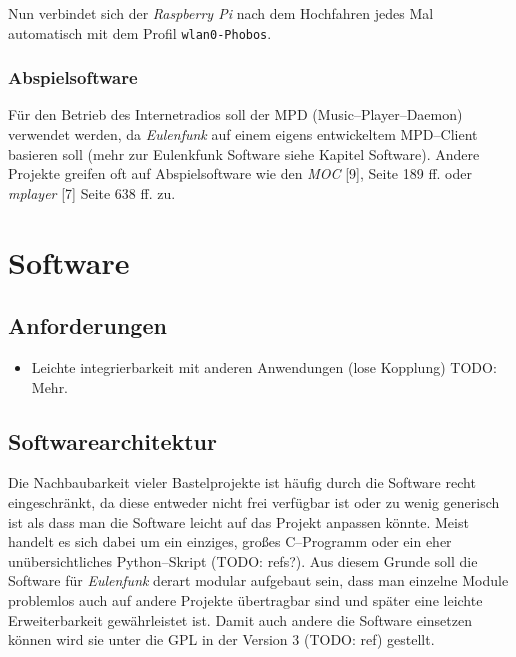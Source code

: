 \documentclass[11pt,ngerman,toc=listof,index=totoc]{scrreprt}
\newenvironment{Shaded}{}{}
\newcommand{\KeywordTok}[1]{\textcolor[rgb]{0.00,0.44,0.13}{\textbf{{#1}}}}
\newcommand{\CommentTok}[1]{\textcolor[rgb]{0.38,0.63,0.69}{\textit{{#1}}}}
\newcommand{\NormalTok}[1]{{#1}}
\providecommand{\tightlist}{%
  \setlength{\itemsep}{0pt}\setlength{\parskip}{0pt}}
\begin{document}
Nun verbindet sich der \emph{Raspberry Pi} nach dem Hochfahren jedes Mal
automatisch mit dem Profil \texttt{wlan0-Phobos}.

\subsection{Abspielsoftware}\label{abspielsoftware}

Für den Betrieb des Internetradios soll der MPD (Music--Player--Daemon)
verwendet werden, da \emph{Eulenfunk} auf einem eigens entwickeltem
MPD--Client basieren soll (mehr zur Eulenkfunk Software siehe Kapitel
Software). Andere Projekte greifen oft auf Abspielsoftware wie den
\emph{MOC} {[}9{]}, Seite 189 ff. oder \emph{mplayer} {[}7{]} Seite 638
ff. zu.

\begin{Shaded}
\end{Shaded}

\chapter{Software}\label{software}

\section{Anforderungen}\label{anforderungen}

\begin{itemize}
\tightlist
\item
  Leichte integrierbarkeit mit anderen Anwendungen (lose Kopplung) TODO:
  Mehr.
\end{itemize}

\section{Softwarearchitektur}\label{softwarearchitektur}

Die Nachbaubarkeit vieler Bastelprojekte ist häufig durch die Software
recht eingeschränkt, da diese entweder nicht frei verfügbar ist oder zu
wenig generisch ist als dass man die Software leicht auf das Projekt
anpassen könnte. Meist handelt es sich dabei um ein einziges, großes
C--Programm oder ein eher unübersichtliches Python--Skript (TODO:
refs?). Aus diesem Grunde soll die Software für \emph{Eulenfunk} derart
modular aufgebaut sein, dass man einzelne Module problemlos auch auf
andere Projekte übertragbar sind und später eine leichte Erweiterbarkeit
gewährleistet ist. Damit auch andere die Software einsetzen können wird
sie unter die GPL in der Version 3 (TODO: ref) gestellt.
\end{document}
